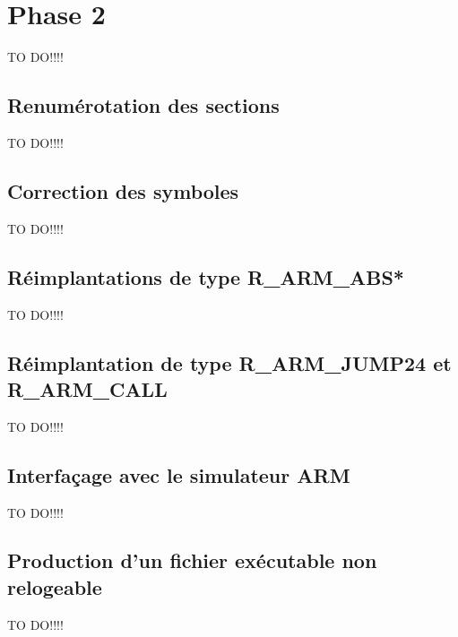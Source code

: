 \documentclass[a4paper]{article} %
\begin{document}

\section{Phase 2}
\label{sec:phase2}
TO DO!!!!

\subsection{Renumérotation des sections}
TO DO!!!!

\subsection{Correction des symboles}
TO DO!!!!

\subsection{Réimplantations de type R\_ARM\_ABS*}
TO DO!!!!

\subsection{Réimplantation de type R\_ARM\_JUMP24 et R\_ARM\_CALL}
TO DO!!!!

\subsection{Interfaçage avec le simulateur ARM}
TO DO!!!!

\subsection{Production d’un fichier exécutable non relogeable}

TO DO!!!!
\end{document}
